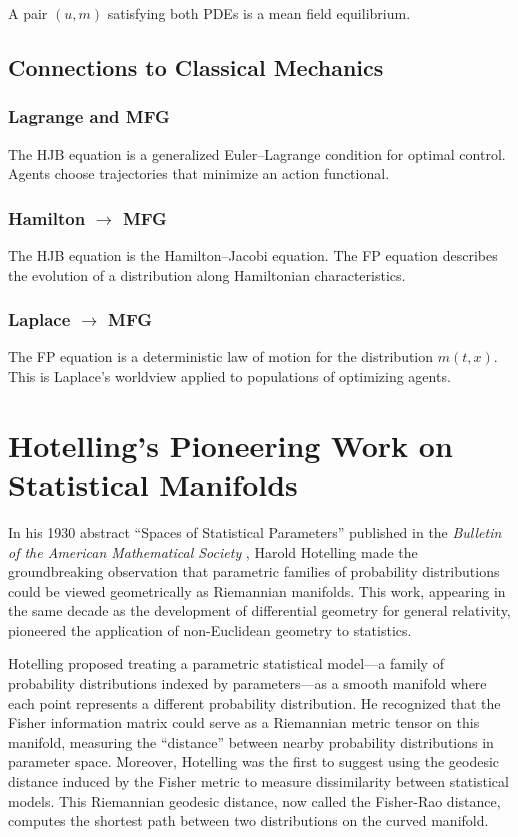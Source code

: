 \documentclass[12pt]{article}
\begin{document}
A pair $(u, m)$ satisfying both PDEs is a mean field equilibrium.


\subsection{Connections to Classical Mechanics}

\subsubsection{Lagrange and MFG}

The HJB equation is a generalized Euler--Lagrange condition for optimal control. Agents choose trajectories that minimize an action functional.

\subsubsection{Hamilton $\to$ MFG}

The HJB equation is the Hamilton--Jacobi equation. The FP equation describes the evolution of a distribution along Hamiltonian characteristics.

\subsubsection{Laplace $\to$ MFG}

The FP equation is a deterministic law of motion for the distribution $m(t, x)$. This is Laplace's worldview applied to populations of optimizing agents.


\section{Hotelling's Pioneering Work on Statistical Manifolds}

In his 1930 abstract ``Spaces of Statistical Parameters'' published in the \emph{Bulletin of the American Mathematical Society} \cite{Hotelling1930}, Harold Hotelling made the groundbreaking observation that parametric families of probability distributions could be viewed geometrically as Riemannian manifolds. This work, appearing in the same decade as the development of differential geometry for general relativity, pioneered the application of non-Euclidean geometry to statistics.

Hotelling proposed treating a parametric statistical model---a family of probability distributions indexed by parameters---as a smooth manifold where each point represents a different probability distribution. He recognized that the Fisher information matrix could serve as a Riemannian metric tensor on this manifold, measuring the ``distance'' between nearby probability distributions in parameter space. Moreover, Hotelling was the first to suggest using the geodesic distance induced by the Fisher metric to measure dissimilarity between statistical models. This Riemannian geodesic distance, now called the Fisher-Rao distance, computes the shortest path between two distributions on the curved manifold.
\end{document}

